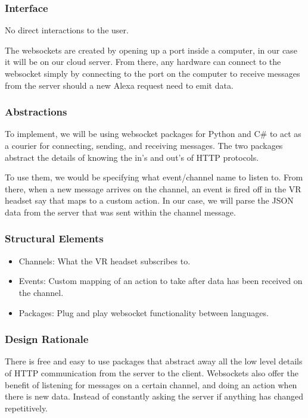 \documentclass[onecolumn, draftclsnofoot,10pt, compsoc]{IEEEtran}
\begin{document}
        \subsubsection{Interface}
            No direct interactions to the user. 
            
            The websockets are created by opening up a port inside a computer, in our case it will be on our cloud server. From there, any hardware can connect to the websocket simply by connecting to the port on the computer to receive messages from the server should a new Alexa request need to emit data.

        
        \subsubsection{Abstractions}
            To implement, we will be using websocket packages for Python and C\# to act as a courier for connecting, sending, and receiving messages. The two packages abstract the details of knowing the in{'}s and out{'}s of HTTP protocols. 
            
            To use them, we would be specifying what event/channel name to listen to. From there, when a new message arrives on the channel, an event is fired off in the VR headset say that maps to a custom action. In our case, we will parse the JSON data from the server that was sent within the channel message.
        
        \subsubsection{Structural Elements}
            \begin{itemize}
                \item Channels: What the VR headset subscribes to.
                \item Events: Custom mapping of an action to take after data has been received on the channel. 
                \item Packages: Plug and play websocket functionality between languages.
            \end{itemize}
        
        \subsubsection{Design Rationale}
            There is free and easy to use packages that abstract away all the low level details of HTTP communication from the server to the client. Websockets also offer the benefit of listening for messages on a certain channel, and doing an action when there is new data. Instead of constantly asking the server if anything has changed repetitively.
        
\end{document}
